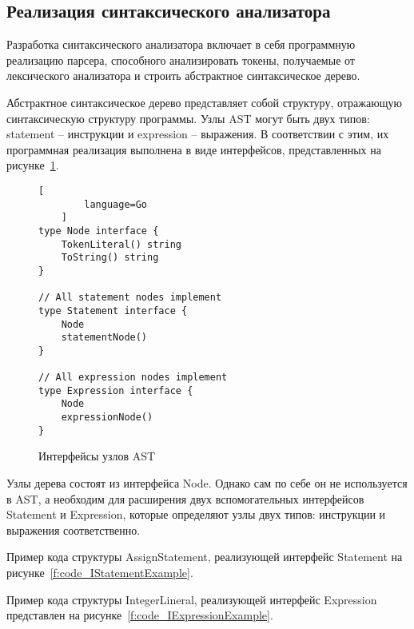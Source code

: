 \subsection{Реализация синтаксического анализатора}

Разработка синтаксического анализатора включает в себя программную реализацию парсера, способного анализировать токены, получаемые от лексического анализатора и строить абстрактное синтаксическое дерево.

Абстрактное синтаксическое дерево представляет собой структуру, отражающую синтаксическую структуру программы.
Узлы AST могут быть двух типов: statement -- инструкции и expression -- выражения. 
В соответствии с этим, их программная реализация выполнена в виде интерфейсов, представленных на рисунке~\ref{f:code_astInterfaces}.

\begin{figure}[ht]
	\centering
	\vspace{\toppaddingoffigure}
	\begin{lstlisting}[
        language=Go
    ]
type Node interface {
    TokenLiteral() string
    ToString() string
}

// All statement nodes implement
type Statement interface {
    Node
    statementNode()
}

// All expression nodes implement
type Expression interface {
    Node
    expressionNode()
} 
\end{lstlisting}
	\caption{Интерфейсы узлов AST}
	\label{f:code_astInterfaces}
\end{figure}

Узлы дерева состоят из интерфейса Node.
Однако сам по себе он не используется в AST, а необходим для расширения двух вспомогательных интерфейсов Statement и Expression, которые определяют узлы двух типов: инструкции и выражения соответственно.

Пример кода структуры AssignStatement, реализующей интерфейс Statement на рисунке~\ref{f:code_IStatementExample}.

Пример кода структуры IntegerLineral, реализующей интерфейс Expression представлен на рисунке~\ref{f:code_IExpressionExample}.

